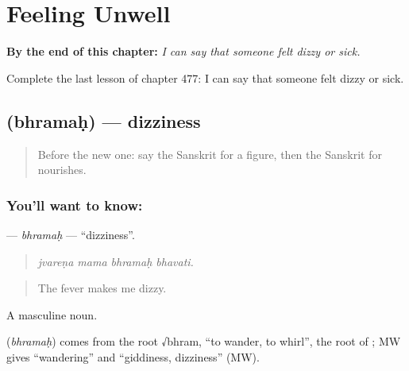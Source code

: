 
\chapter{Feeling Unwell}
\label{ch:sa-feeling-unwell}

\begin{chapteropening}
\textbf{By the end of this chapter:} \emph{I can say that someone felt dizzy or sick.}

Complete the last lesson of chapter 477: I can say that someone felt dizzy or sick.
\end{chapteropening}

\section[\texorpdfstring{\sk{भ्रमः} (bhramaḥ)}{भ्रमः (bhramaḥ)}]{ (bhramaḥ) — dizziness}

\label{lesson:SA-C477-bhramah}



\begin{quote}
Before the new one: say the Sanskrit for a figure, then the Sanskrit for nourishes.
\end{quote}

\subsection*{You'll want to know: }
\textbf{} — \emph{bhramaḥ} — \textquotedblleft{}dizziness\textquotedblright{}.

\begin{quote}
   
\end{quote}

\begin{quote}
\emph{jvareṇa mama bhramaḥ bhavati.}
\end{quote}

\begin{quote}
The fever makes me dizzy.
\end{quote}

A masculine noun.

\begin{cousinweb}
\textbf{} (\emph{bhramaḥ}) comes from the root √bhram, \textquotedblleft{}to wander, to whirl\textquotedblright{}, the root of \textbf{}; MW gives \textquotedblleft{}wandering\textquotedblright{} and \textquotedblleft{}giddiness, dizziness\textquotedblright{} (MW).
\end{cousinweb}

